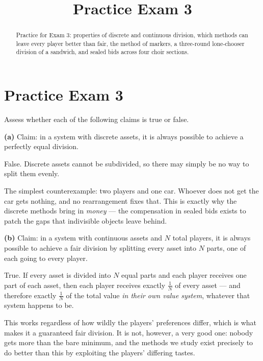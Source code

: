 \documentclass[12pt]{ximera}
\title{Practice Exam 3}
\begin{document}
\begin{abstract}
Practice for Exam 3: properties of discrete and continuous division, which methods can
leave every player better than fair, the method of markers, a three-round lone-chooser
division of a sandwich, and sealed bids across four choir sections.
\end{abstract}
\maketitle

\section*{Practice Exam 3}

\begin{problem}
Assess whether each of the following claims is true or false.

\begin{prompt}
\textbf{(a)} Claim: in a system with discrete assets, it is always possible to achieve a
perfectly equal division.

\begin{multipleChoice}
\end{multipleChoice}

\begin{feedback}
False. Discrete assets cannot be subdivided, so there may simply be no way to split
them evenly.

The simplest counterexample: two players and one car. Whoever does not get the car gets
nothing, and no rearrangement fixes that. This is exactly why the discrete methods bring
in \emph{money} --- the compensation in sealed bids exists to patch the gaps that
indivisible objects leave behind.
\end{feedback}
\end{prompt}

\begin{prompt}
\textbf{(b)} Claim: in a system with continuous assets and $N$ total players, it is
always possible to achieve a fair division by splitting every asset into $N$ parts, one
of each going to every player.

\begin{multipleChoice}
\end{multipleChoice}

\begin{feedback}
True. If every asset is divided into $N$ equal parts and each player receives one part
of each asset, then each player receives exactly $\frac1N$ of every asset --- and
therefore exactly $\frac1N$ of the total value \emph{in their own value system},
whatever that system happens to be.

This works regardless of how wildly the players' preferences differ, which is what makes
it a guaranteed fair division. It is not, however, a very good one: nobody gets more
than the bare minimum, and the methods we study exist precisely to do better than this
by exploiting the players' differing tastes.
\end{feedback}
\end{prompt}
\end{problem}
\end{document}
